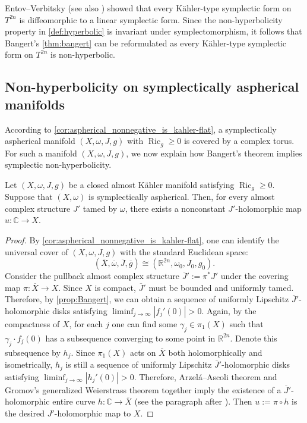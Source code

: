 \documentclass[11pt,twoside]{amsart}
\DeclareMathOperator{\Ric}{Ric}
\newcommand{\R}{\mathbb{R}}
\newcommand{\C}{\mathbb{C}}
\begin{document}
  \begin{remark} 
  Entov--Verbitsky
\cite[Proposition 6.1]{EVLag} (see also \cite{spaceofKahlerform}) showed that every K\"ahler-type symplectic form on \(T^{2n}\) is  diffeomorphic to a linear symplectic form.
Since the non-hyperbolicity property in
\autoref{def:hyperbolic} is invariant under symplectomorphism, it follows that Bangert's \autoref{thm:bangert} can be reformulated as every K\"ahler-type symplectic form on \(T^{2n}\) is non-hyperbolic.
\end{remark}


\subsection{Non-hyperbolicity on symplectically aspherical manifolds}
According to \autoref{cor:aspherical_nonnegative_is_kahler-flat}, a symplectically aspherical manifold $(X,\omega,J,g)$ with $\Ric_g \ge 0$ is covered by a complex torus. For such a manifold $(X,\omega,J,g)$, we now explain how Bangert's theorem implies symplectic non-hyperbolicity.

\begin{corollary*}
Let $(X,\omega,J,g)$ be a closed almost K\"ahler manifold satisfying \( \Ric_g\geq0. \) Suppose that $(X,\omega)$ is symplectically aspherical. Then, for every almost complex structure $J'$ tamed by $\omega$, there exists a nonconstant $J'$-holomorphic map \( u\colon \mathbb C\rightarrow X \).
\end{corollary*}


\begin{proof}
    By \autoref{cor:aspherical_nonnegative_is_kahler-flat}, one can identify the universal cover of $(X,\omega,J,g)$ with the standard Euclidean space: \[(\overline{X},\overline{\omega},\overline{J},\overline{g})\cong(\R^{2n},\omega_0,J_0,g_0).\]
    Consider the pullback almost complex structure $\overline{J}':=\pi^*J'$ under the covering map $\pi\colon \overline{X}\rightarrow X$. Since $X$ is compact, $\overline{J}'$ must be bounded and uniformly tamed. Therefore, by \autoref{prop:Bangert}, we can obtain a sequence of uniformly Lipschitz $\overline{J}'$-holomorphic disks satisfying $\liminf_{j\to\infty}|f_j'(0)|>0$. Again, by the compactness of $X$, for each $j$ one can find some $\gamma_j\in\pi_1(X)$ such that $\gamma_j\cdot f_j(0)$ has a subsequence converging to some point in $\R^{2n}$. Denote this subsequence by $h_j$. Since $\pi_1(X)$ acts on $\overline{X}$ both holomorphically and isometrically, $h_j$ is still a sequence of uniformly Lipschitz $\overline{J}'$-holomorphic disks satisfying $\liminf_{j\to\infty}|h_j'(0)|>0$. Therefore, Arzel\'a--Ascoli theorem and Gromov's generalized Weierstrass theorem \cite[III.3.1]{hummel1997} together imply the existence of a $\overline{J}'$-holomorphic entire curve $h\colon \C\to \overline{X}$ (see the paragraph after \cite[Proposition 2.7]{Bangert1998Existence}). Then $u:= \pi\circ h$ is the desired $J'$-holomorphic map to $X$.
\end{proof}
\end{document}
